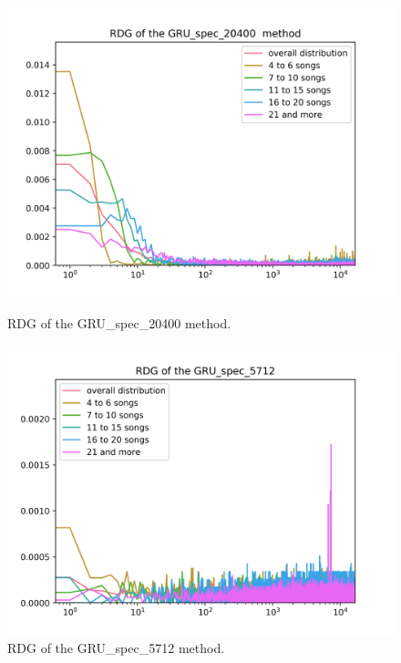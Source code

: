 \begin{figure}[h]
\centering
\begin{minipage}{.45\textwidth}
  \centering
  \includegraphics[width=1\linewidth]{./img/gru_spec_20400_graph.png}
  \caption[RDG of the GRU\_spec\_20400 method]{RDG of the \newline GRU\_spec\_20400 method.}
  \label{fig:gru_spec_20400_distribution}
\end{minipage}
 \vspace{1cm}
\begin{minipage}{.45\textwidth}
  \centering
  \includegraphics[width=1\linewidth]{./img/gru_spec_5712_graph.png}
  \caption[RDG of the GRU\_spec\_5712 method]{RDG of the \newline GRU\_spec\_5712 method.}
  \label{fig:gru_spec_5712_distribution}
\end{minipage}
\end{figure}\label{fig:gru_spec_distributions}

